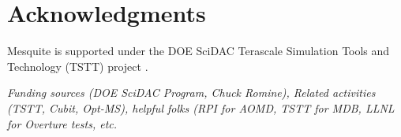 \chapter{Acknowledgments}

Mesquite is supported under the DOE SciDAC Terascale Simulation 
Tools and Technology (TSTT) project \cite{tstt}.  

{\it Funding sources (DOE SciDAC Program, Chuck Romine), Related activities
(TSTT, Cubit, Opt-MS), helpful folks (RPI for AOMD, TSTT for MDB, LLNL
for Overture tests, etc.}
